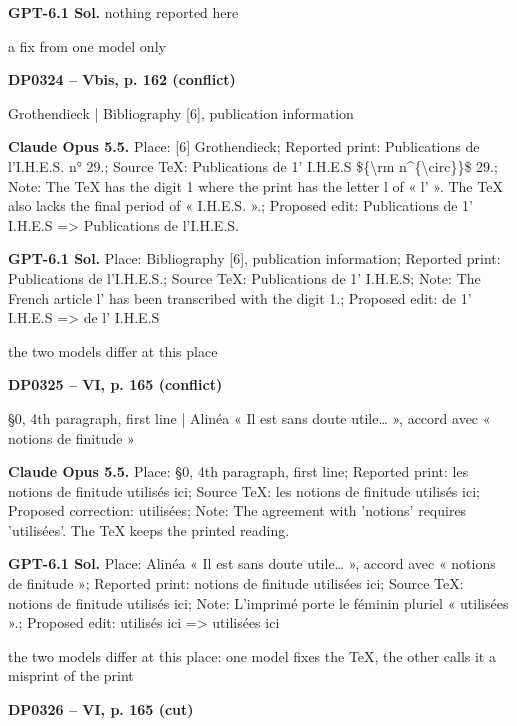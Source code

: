 \textbf{GPT-6.1 Sol.} nothing reported here\par
a fix from one model only\par
\par\noindent\hypertarget{DP0324}{}\textbf{DP0324 -- Vbis, p. 162 (conflict)}\par
[6] Grothendieck | Bibliography [6], publication information\par
\textbf{Claude Opus 5.5.} Place: [6] Grothendieck; Reported print: Publications de l'I.H.E.S. n° 29.; Source TeX: Publications de 1' I.H.E.S \$\{\textbackslash{}rm n\textasciicircum{}\{\textbackslash{}circ\}\}\$ 29.; Note: The TeX has the digit 1 where the print has the letter l of « l' ». The TeX also lacks the final period of « I.H.E.S. ».; Proposed edit: Publications de 1' I.H.E.S =\allowbreak > Publications de l'I.H.E.S.\par
\textbf{GPT-6.1 Sol.} Place: Bibliography [6], publication information; Reported print: Publications de l'I.H.E.S.; Source TeX: Publications de 1' I.H.E.S; Note: The French article l' has been transcribed with the digit 1.; Proposed edit: de 1' I.H.E.S =\allowbreak > de l' I.H.E.S\par
the two models differ at this place\par
\par\noindent\hypertarget{DP0325}{}\textbf{DP0325 -- VI, p. 165 (conflict)}\par
§0, 4th paragraph, first line | Alinéa « Il est sans doute utile… », accord avec « notions de finitude »\par
\textbf{Claude Opus 5.5.} Place: §0, 4th paragraph, first line; Reported print: les notions de finitude utilisés ici; Source TeX: les notions de finitude utilisés ici; Proposed correction: utilisées; Note: The agreement with 'notions' requires 'utilisées'. The TeX keeps the printed reading.\par
\textbf{GPT-6.1 Sol.} Place: Alinéa « Il est sans doute utile… », accord avec « notions de finitude »; Reported print: notions de finitude utilisées ici; Source TeX: notions de finitude utilisés ici; Note: L’imprimé porte le féminin pluriel « utilisées ».; Proposed edit: utilisés ici =\allowbreak > utilisées ici\par
the two models differ at this place: one model fixes the TeX, the other calls it a misprint of the print\par
\par\noindent\hypertarget{DP0326}{}\textbf{DP0326 -- VI, p. 165 (cut)}\par
